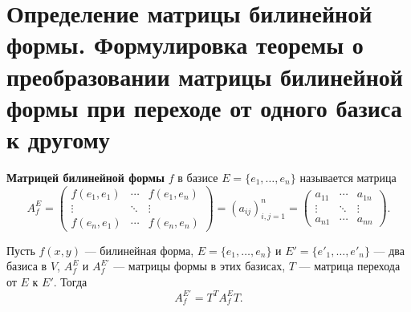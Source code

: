 \section{Определение матрицы билинейной формы. Формулировка теоремы о преобразовании матрицы билинейной формы при переходе от одного базиса к другому}

\begin{definition}
\textbf{Матрицей билинейной формы} $f$ в базисе $E = \{e_1, \ldots, e_n\}$ называется матрица
\[
A_f^E = \begin{pmatrix}
f(e_1, e_1) & \cdots & f(e_1, e_n) \\
\vdots & \ddots & \vdots \\
f(e_n, e_1) & \cdots & f(e_n, e_n)
\end{pmatrix} = (a_{ij})_{i,j=1}^{n} = \begin{pmatrix}
a_{11} & \cdots & a_{1n} \\
\vdots & \ddots & \vdots \\
a_{n1} & \cdots & a_{nn}
\end{pmatrix}.
\]
\end{definition}

\begin{theorem}
Пусть $f(x, y)$ --- билинейная форма, $E = \{e_1, \ldots, e_n\}$ и $E' = \{e'_1, \ldots, e'_n\}$ --- два базиса в $V$, $A_f^E$ и $A_f^{E'}$ --- матрицы формы в этих базисах, $T$ --- матрица перехода от $E$ к $E'$. Тогда
\[
A_f^{E'} = T^T A_f^E T.
\]
\end{theorem}
